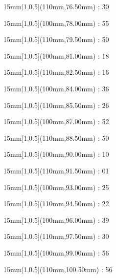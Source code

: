 \documentclass[a4paper]{memoir}
\begin{document}
\begin{textblock*}{15mm}[1,0.5](110mm,76.50mm) : 30\end{textblock*}
\begin{textblock*}{15mm}[1,0.5](100mm,78.00mm) : 55\end{textblock*}
\begin{textblock*}{15mm}[1,0.5](110mm,79.50mm) : 50\end{textblock*}
\begin{textblock*}{15mm}[1,0.5](100mm,81.00mm) : 18\end{textblock*}
\begin{textblock*}{15mm}[1,0.5](110mm,82.50mm) : 16\end{textblock*}
\begin{textblock*}{15mm}[1,0.5](100mm,84.00mm) : 36\end{textblock*}
\begin{textblock*}{15mm}[1,0.5](110mm,85.50mm) : 26\end{textblock*}
\begin{textblock*}{15mm}[1,0.5](100mm,87.00mm) : 52\end{textblock*}
\begin{textblock*}{15mm}[1,0.5](110mm,88.50mm) : 50\end{textblock*}
\begin{textblock*}{15mm}[1,0.5](100mm,90.00mm) : 10\end{textblock*}
\begin{textblock*}{15mm}[1,0.5](110mm,91.50mm) : 01\end{textblock*}
\begin{textblock*}{15mm}[1,0.5](100mm,93.00mm) : 25\end{textblock*}
\begin{textblock*}{15mm}[1,0.5](110mm,94.50mm) : 22\end{textblock*}
\begin{textblock*}{15mm}[1,0.5](100mm,96.00mm) : 39\end{textblock*}
\begin{textblock*}{15mm}[1,0.5](110mm,97.50mm) : 30\end{textblock*}
\begin{textblock*}{15mm}[1,0.5](100mm,99.00mm) : 56\end{textblock*}
\begin{textblock*}{15mm}[1,0.5](110mm,100.50mm) : 56\end{textblock*}
\end{document}
